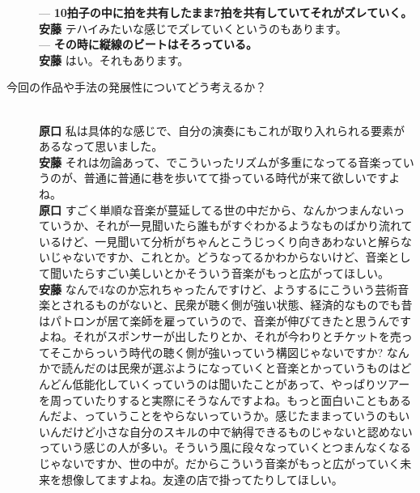 \documentclass[uplatex,dvipdfmx]{ujarticle}
\begin{document}
\begin{description}
--- {\bf 10拍子の中に拍を共有したまま7拍を共有していてそれがズレていく。}\\

{\bf 安藤} テハイみたいな感じでズレていくというのもあります。\\

--- {\bf その時に縦線のビートはそろっている。}\\

{\bf 安藤} はい。それもあります。\\

\item [今回の作品や手法の発展性についてどう考えるか？]\mbox{}\\

{\bf 原口} 私は具体的な感じで、自分の演奏にもこれが取り入れられる要素があるなって思いました。\\

{\bf 安藤} それは勿論あって、でこういったリズムが多重になってる音楽っていうのが、普通に普通に巷を歩いてて掛っている時代が来て欲しいですよね。\\

{\bf 原口} すごく単順な音楽が蔓延してる世の中だから、なんかつまんないっていうか、それが一見聞いたら誰もがすぐわかるようなものばかり流れているけど、一見聞いて分析がちゃんとこうじっくり向きあわないと解らないじゃないですか、これとか。どうなってるかわからないけど、音楽として聞いたらすごい美しいとかそういう音楽がもっと広がってほしい。\\

{\bf 安藤} なんで4なのか忘れちゃったんですけど、ようするにこういう芸術音楽とされるものがないと、民衆が聴く側が強い状態、経済的なものでも昔はパトロンが居て楽師を雇っていうので、音楽が伸びてきたと思うんですよね。それがスポンサーが出したりとか、それが今わりとチケットを売ってそこからっいう時代の聴く側が強いっていう構図じゃないですか? なんかで読んだのは民衆が選ぶようになっていくと音楽とかっていうものはどんどん低能化していくっていうのは聞いたことがあって、やっぱりツアーを周っていたりすると実際にそうなんですよね。もっと面白いこともあるんだよ、っていうことをやらないっていうか。感じたままっていうのもいいんだけど小さな自分のスキルの中で納得できるものじゃないと認めないっていう感じの人が多い。そういう風に段々なっていくとつまんなくなるじゃないですか、世の中が。だからこういう音楽がもっと広がっていく未来を想像してますよね。友達の店で掛ってたりしてほしい。
\end{description}
\end{document}
